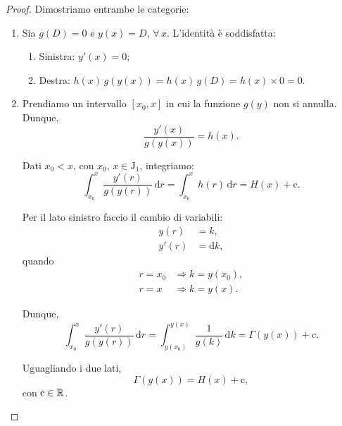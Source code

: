 \documentclass[../../analisi2]{subfiles}
\begin{document}
        \begin{proof}
            Dimostriamo entrambe le categorie:
            \begin{enumerate}
                \item Sia \(g(D) = 0\) e \(y(x) = D\), \(\forall \, x\).
                    L'identità è soddisfatta:
                    \begin{enumerate}
                        \item Sinistra: \(y'(x) = 0\);
                        \item Destra: \(h(x) \, g(y(x)) = h(x) \, g(D) = h(x) \times 0 = 0\).
                    \end{enumerate}
                \item Prendiamo un intervallo \([x_0, x]\) in cui la funzione \(g(y)\) non si annulla. Dunque,
                    \[
                        \frac{y'(x)}{g(y(x))} = h(x).
                    \]

                    Dati \(x_0 < x\), con \(x_0, \, x \in \mathrm{J}_1\), integriamo:
                    \[
                        \int_{x_0}^{x} \! \frac{y'(r)}{g(y(r))} \, \mathrm{d}r = \int_{x_0}^{x} \! h(r) \, \mathrm{d}r = H(x) + \mathrm{c}.
                    \]

                    Per il lato sinistro faccio il cambio di variabili:
                    \begin{align*}
                        y(r) &= k,\\
                        y'(r) &= \mathrm{d}k,
                    \end{align*}
                    quando
                    \begin{align*}
                        r = x_0 &\Rightarrow k = y(x_0),\\
                        r = x &\Rightarrow k = y(x).
                    \end{align*}

                    Dunque,
                    \[
                        \int_{x_0}^{x} \! \frac{y'(r)}{g(y(r))} \, \mathrm{d}r = \int_{y(x_0)}^{y(x)} \! \frac{1}{g(k)} \, \mathrm{d}k = \Gamma(y(x)) + \mathrm{c}.
                    \]

                    Uguagliando i due lati,
                    \[
                        \Gamma(y(x)) = H(x) + \mathrm{c},
                    \]
                    con \(\mathrm{c} \in \mathbb{R}\).
            \end{enumerate}
        \end{proof}
            
\end{document}
